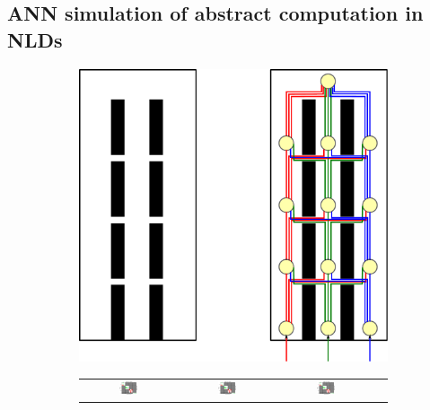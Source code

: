 \subsection{ANN simulation of abstract computation in NLDs}

\begin{figure}
\begin{center}
\begin{subfigure}[b]{0.45\linewidth}
\begin{center}
\includegraphics[width=.65\linewidth]{../fig/aogeometry.pdf}\caption{}\label{fig:nnGeo}
\end{center}
\end{subfigure}
\begin{subfigure}[b]{0.45\linewidth}
\begin{center}
\begin{tabular}{cccc}
{\includegraphics[width=0.2\textwidth,page=1]{../fig/combined.pdf}} 
   & {\includegraphics[width=0.2\textwidth,page=2]{../fig/combined.pdf}}
   & {\includegraphics[width=0.2\textwidth,page=3]{../fig/combined.pdf}} 

\end{tabular}
\end{center}
\end{subfigure}
\end{center}
\end{figure}
